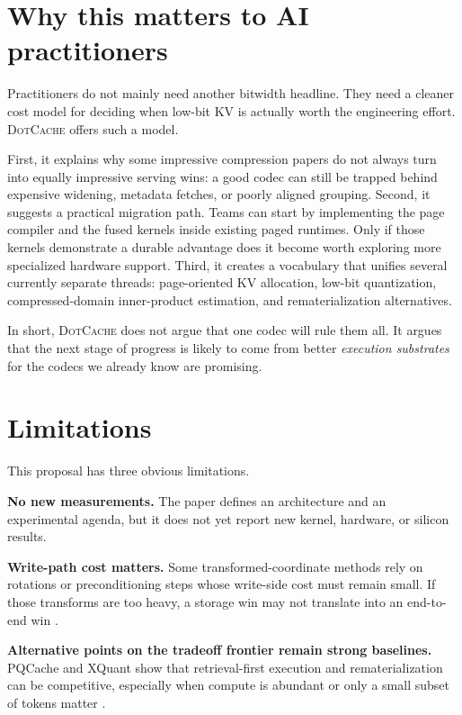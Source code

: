 \documentclass[11pt]{article}
\newcommand{\method}{\textsc{DotCache}}
\newcommand{\kv}{KV}
\begin{document}
\section{Why this matters to AI practitioners}

Practitioners do not mainly need another bitwidth headline. They need a cleaner cost model for deciding when low-bit \kv{} is actually worth the engineering effort. \method{} offers such a model.

First, it explains why some impressive compression papers do not always turn into equally impressive serving wins: a good codec can still be trapped behind expensive widening, metadata fetches, or poorly aligned grouping. Second, it suggests a practical migration path. Teams can start by implementing the page compiler and the fused kernels inside existing paged runtimes. Only if those kernels demonstrate a durable advantage does it become worth exploring more specialized hardware support. Third, it creates a vocabulary that unifies several currently separate threads: page-oriented \kv{} allocation, low-bit quantization, compressed-domain inner-product estimation, and rematerialization alternatives.

In short, \method{} does not argue that one codec will rule them all. It argues that the next stage of progress is likely to come from better \emph{execution substrates} for the codecs we already know are promising.

\section{Limitations}

This proposal has three obvious limitations.

\textbf{No new measurements.} The paper defines an architecture and an experimental agenda, but it does not yet report new kernel, hardware, or silicon results.

\textbf{Write-path cost matters.} Some transformed-coordinate methods rely on rotations or preconditioning steps whose write-side cost must remain small. If those transforms are too heavy, a storage win may not translate into an end-to-end win \cite{polarquant,turboquant}.

\textbf{Alternative points on the tradeoff frontier remain strong baselines.} PQCache and XQuant show that retrieval-first execution and rematerialization can be competitive, especially when compute is abundant or only a small subset of tokens matter \cite{pqcache,xquant}.
\end{document}
